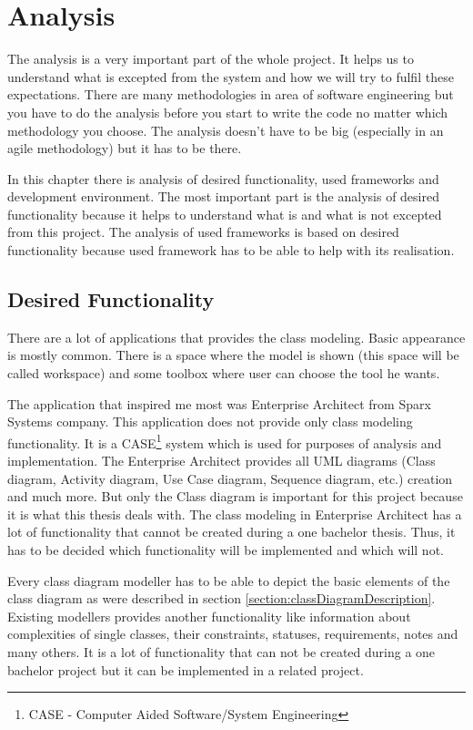 \chapter{Analysis}

The analysis is a very important part of the whole project. It helps us to understand what is excepted from the system and how we will try to fulfil these expectations. There are many methodologies in area of software engineering but you have to do the analysis before you start to write the code no matter which methodology you choose. The analysis doesn't have to be big (especially in an agile methodology) but it has to be there.

In this chapter there is analysis of desired functionality, used frameworks and development environment. The most important part is the analysis of desired functionality because it helps to understand what is and what is not excepted from this project. The analysis of used frameworks is based on desired functionality because used framework has to be able to help with its realisation.

\section{Desired Functionality}

There are a lot of applications that provides the class modeling. Basic appearance is mostly common. There is a space where the model is shown (this space will be called workspace) and some toolbox where user can choose the tool he wants.

The application that inspired me most was Enterprise Architect from Sparx Systems \cite{sparxsystemsweb} company. This application does not provide only class modeling functionality. It is a CASE\footnote{CASE - Computer Aided Software/System Engineering} system which is used for purposes of analysis and implementation. The Enterprise Architect provides all UML diagrams (Class diagram, Activity diagram, Use Case diagram, Sequence diagram, etc.) creation and much more. But only the Class diagram is important for this project because it is what this thesis deals with. The class modeling in Enterprise Architect has a lot of functionality that cannot be created during a one bachelor thesis. Thus, it has to be decided which functionality will be implemented and which will not.

Every class diagram modeller has to be able to depict the basic elements of the class diagram as were described in section \ref{section:classDiagramDescription}. Existing modellers provides another functionality like information about complexities of single classes, their constraints, statuses, requirements, notes and many others. It is a lot of functionality that can not be created during a one bachelor project but it can be implemented in a related project.

